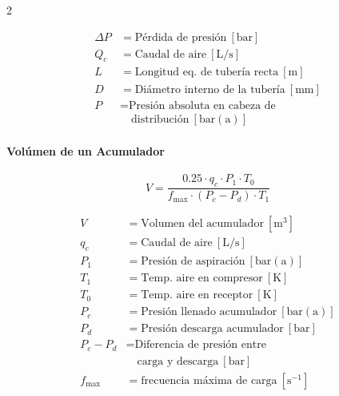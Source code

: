 \documentclass[11pt]{article}
\begin{document}
\begin{multicols*}{2}
    \begin{minipage}{\linewidth}
        \begin{align*}
            \Delta P &= \text{Pérdida de presión} \ \mathrm{[bar]} \\
            Q_c &= \text{Caudal de aire} \ \mathrm{[L/s]} \\
            L &= \text{Longitud eq. de tubería recta} \ \mathrm{[m]} \\
            D &= \text{Diámetro interno de la tubería} \ \mathrm{[mm]} \\
            P &= \text{Presión absoluta en cabeza de} \\
            &\quad \text{distribución} \ \mathrm{[bar(a)]}
        \end{align*}
    \end{minipage}

    \paragraph*{Volúmen de un Acumulador}

    \begin{equation}
        V = \frac{0.25 \cdot q_c \cdot P_1 \cdot T_0}{f_{\max}\cdot \left(P_c - P_d\right) \cdot T_1}
    \end{equation}

    \begin{minipage}{\linewidth}
        \begin{align*}
            V &= \text{Volumen del acumulador} \ \mathrm{[m^3]} \\
            q_c &= \text{Caudal de aire} \ \mathrm{[L/s]} \\
            P_1 &= \text{Presión de aspiración} \ \mathrm{[bar(a)]} \\
            T_1 &= \text{Temp. aire en compresor} \ \mathrm{[K]} \\
            T_0 &= \text{Temp. aire en receptor} \ \mathrm{[K]} \\
            P_c &= \text{Presión llenado acumulador} \ \mathrm{[bar(a)]} \\
            P_d &= \text{Presión descarga acumulador} \ \mathrm{[bar]} \\
            P_c - P_d &= \text{Diferencia de presión entre} \\ 
            &\quad \text{carga y descarga} \ \mathrm{[bar]} \\
            f_{\max} &= \text{frecuencia máxima de carga} \ \mathrm{[s^{-1}]} 
        \end{align*}
    \end{minipage}


\end{multicols*}
\end{document}
